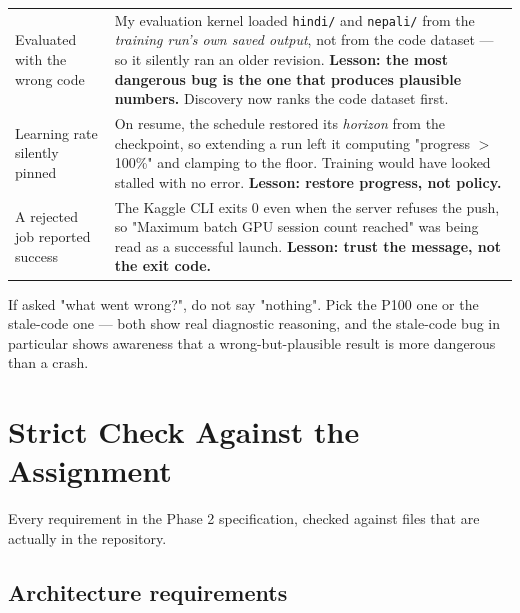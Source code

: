 \documentclass[11pt]{report}
\newcommand{\p}[1]{\texttt{#1}}
\begin{document}
\begin{center}
\begin{longtable}{p{}p{}}
Evaluated with the wrong code &
My evaluation kernel loaded \p{hindi/} and \p{nepali/} from the \emph{training
run's own saved output}, not from the code dataset --- so it silently ran an older
revision. \textbf{Lesson: the most dangerous bug is the one that produces
plausible numbers.} Discovery now ranks the code dataset first. \\
\addlinespace
Learning rate silently pinned &
On resume, the schedule restored its \emph{horizon} from the checkpoint, so
extending a run left it computing "progress $>$ 100\%" and clamping to the floor.
Training would have looked stalled with no error. \textbf{Lesson: restore
progress, not policy.} \\
\addlinespace
A rejected job reported success &
The Kaggle CLI exits 0 even when the server refuses the push, so "Maximum batch
GPU session count reached" was being read as a successful launch. \textbf{Lesson:
trust the message, not the exit code.} \\
\bottomrule
\end{longtable}
\end{center}

\begin{notebox}
If asked "what went wrong?", do not say "nothing". Pick the P100 one or the
stale-code one --- both show real diagnostic reasoning, and the stale-code bug in
particular shows awareness that a wrong-but-plausible result is more dangerous
than a crash.
\end{notebox}

\chapter{Strict Check Against the Assignment}
\label{ch:compliance}

Every requirement in the Phase 2 specification, checked against files that are
actually in the repository.

\section{Architecture requirements}
\end{document}
